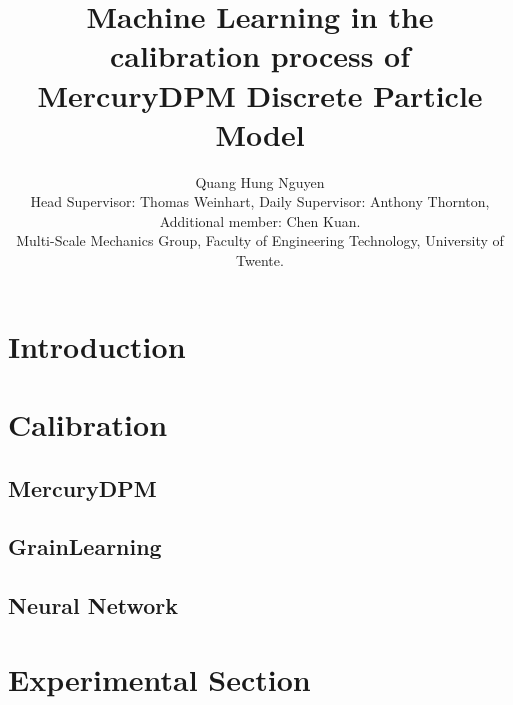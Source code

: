 \documentclass{article}
\title{Machine Learning in the calibration process of MercuryDPM Discrete Particle Model}
\author{Quang Hung Nguyen\\[1ex] \small Head Supervisor: Thomas Weinhart, Daily Supervisor: Anthony Thornton, Additional member: Chen Kuan. \\
\small Multi-Scale Mechanics Group, Faculty of Engineering Technology, University of Twente.}
\date{}
\begin{document}
\maketitle

\section{Introduction}





% 


% 



\section{Calibration}


\subsection{MercuryDPM}


\subsection{GrainLearning}


\subsection{Neural Network}


\section{Experimental Section}


\pagebreak  


\end{document}
